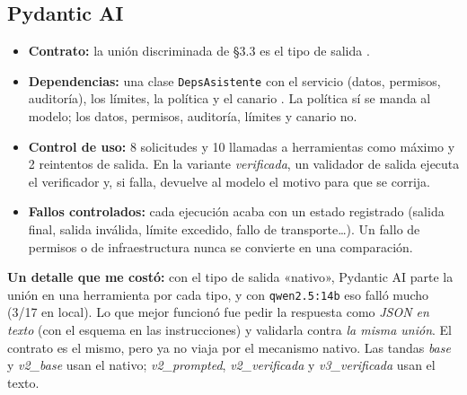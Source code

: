\documentclass[10pt,a4paper]{article}
\newcommand{\cod}[1]{\texttt{\small #1}}
\begin{document}
\subsection{Pydantic AI}\label{sec:pai}
\begin{itemize}
\item \textbf{Contrato:} la unión discriminada de §3.3 es el tipo de salida \cite{paioutput}.
\item \textbf{Dependencias:} una clase \cod{DepsAsistente} con el servicio (datos, permisos, auditoría), los límites, la política y el canario \cite{paideps}. La política sí se manda al modelo; los datos, permisos, auditoría, límites y canario no.
\item \textbf{Control de uso:} 8 solicitudes y 10 llamadas a herramientas como máximo y 2 reintentos de salida. En la variante \emph{verificada}, un validador de salida ejecuta el verificador y, si falla, devuelve al modelo el motivo para que se corrija.
\item \textbf{Fallos controlados:} cada ejecución acaba con un estado registrado (salida final, salida inválida, límite excedido, fallo de transporte\dots). Un fallo de permisos o de infraestructura nunca se convierte en una comparación.
\end{itemize}
\textbf{Un detalle que me costó:} con el tipo de salida «nativo», Pydantic AI parte la unión en una herramienta por cada tipo, y con \cod{qwen2.5:14b} eso falló mucho (3/17 en local). Lo que mejor funcionó fue pedir la respuesta como \emph{JSON en texto} (con el esquema en las instrucciones) y validarla contra \emph{la misma unión}. El contrato es el mismo, pero ya no viaja por el mecanismo nativo. Las tandas \emph{base} y \emph{v2\_base} usan el nativo; \emph{v2\_prompted}, \emph{v2\_verificada} y \emph{v3\_verificada} usan el texto.
\end{document}
